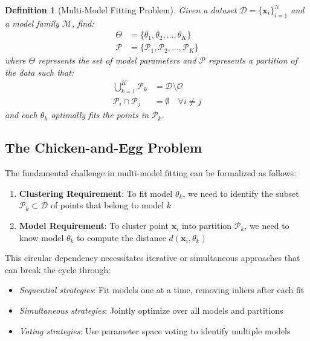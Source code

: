 \documentclass[12pt]{article}
\renewcommand{\vec}[1]{\mathbf{#1}}
\newtheorem{definition}[theorem]{Definition}
\begin{document}
\begin{definition}[Multi-Model Fitting Problem]
    \label{def:multimodel_problem}
    Given a dataset $\mathcal{D} = \{\vec{x}_i\}_{i=1}^N$ and a model family $\mathcal{M}$, find:
    \begin{align}
        \Theta      & = \{\theta_1, \theta_2, \ldots, \theta_K\} \label{eq:model_set}                    \\
        \mathcal{P} & = \{\mathcal{P}_1, \mathcal{P}_2, \ldots, \mathcal{P}_K\} \label{eq:partition_set}
    \end{align}
    where $\Theta$ represents the set of model parameters and $\mathcal{P}$ represents a partition of the data such that:
    \begin{align}
        \bigcup_{k=1}^K \mathcal{P}_k    & = \mathcal{D} \setminus \mathcal{O} \label{eq:partition_union}   \\
        \mathcal{P}_i \cap \mathcal{P}_j & = \emptyset \quad \forall i \neq j \label{eq:partition_disjoint}
    \end{align}
    and each $\theta_k$ optimally fits the points in $\mathcal{P}_k$.
\end{definition}


\subsection{The Chicken-and-Egg Problem}
\label{subsec:chicken_egg}

The fundamental challenge in multi-model fitting can be formalized as follows:

\begin{enumerate}
    \item \textbf{Clustering Requirement}: To fit model $\theta_k$, we need to identify the subset $\mathcal{P}_k \subset \mathcal{D}$ of points that belong to model $k$
    \item \textbf{Model Requirement}: To cluster point $\vec{x}_i$ into partition $\mathcal{P}_k$, we need to know model $\theta_k$ to compute the distance $d(\vec{x}_i, \theta_k)$
\end{enumerate}

This circular dependency necessitates iterative or simultaneous approaches that can break the cycle through:
\begin{itemize}
    \item \textit{Sequential strategies}: Fit models one at a time, removing inliers after each fit
    \item \textit{Simultaneous strategies}: Jointly optimize over all models and partitions
    \item \textit{Voting strategies}: Use parameter space voting to identify multiple models
\end{itemize}
\end{document}
